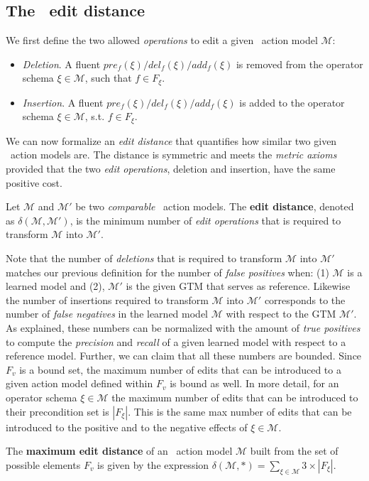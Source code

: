 \subsection{The \strips\ edit distance}

We first define the two allowed \emph{operations} to edit a given \strips\ action model $\mathcal{M}$:
\begin{itemize}
\item {\em Deletion}. A fluent $pre_f(\xi)/del_f(\xi)/add_f(\xi)$ is removed from the operator schema $\xi\in\mathcal{M}$, such that $f\in F_{\xi}$.
\item {\em Insertion}. A fluent $pre_f(\xi)/del_f(\xi)/add_f(\xi)$ is added to the operator schema $\xi\in\mathcal{M}$, s.t. $f\in F_{\xi}$.
\end{itemize}

We can now formalize an {\em edit distance} that quantifies how similar two given \strips\ action models are. The distance is symmetric and meets the {\em metric axioms} provided that the two {\em edit operations}, deletion and insertion, have the same positive cost.

\begin{mydefinition}
  Let $\mathcal{M}$ and $\mathcal{M}'$ be two {\em comparable} \strips\ action models. The {\bf edit distance}, denoted as $\delta(\mathcal{M},\mathcal{M}')$, is the minimum number of {\em edit operations} that is required to transform $\mathcal{M}$ into $\mathcal{M}'$.
\end{mydefinition}

Note that the number of {\em deletions} that is required to transform $\mathcal{M}$ into $\mathcal{M}'$ matches our previous definition for the number of {\em false positives} when: (1) $\mathcal{M}$ is a learned model and (2), $\mathcal{M}'$ is the given GTM that serves as reference. Likewise the number of insertions required to transform $\mathcal{M}$ into $\mathcal{M}'$ corresponds to the number of {\em false negatives} in the learned model $\mathcal{M}$ with respect to the GTM $\mathcal{M}'$. As explained, these numbers can be normalized with the amount of {\em true positives} to compute the {\em precision} and {\em recall} of a given learned model with respect to a reference model. Further, we can claim that all these numbers are bounded. Since $F_v$ is a bound set, the maximum number of edits that can be introduced to a given action model defined within $F_v$ is bound as well. In more detail, for an operator schema $\xi\in\mathcal{M}$ the maximum number of edits that can be introduced to their precondition set is $|F_{\xi}|$. This is the same max number of edits that can be introduced to the positive and to the negative effects of $\xi\in\mathcal{M}$.
\begin{mydefinition}
The \textbf{maximum edit distance} of an \strips\ action model $\mathcal{M}$ built from the set of possible elements $F_v$ is given by the expression $\delta(\mathcal{M},*)=\sum_{\xi\in\mathcal{M}} 3\times|F_{\xi}|$.
\end{mydefinition}

